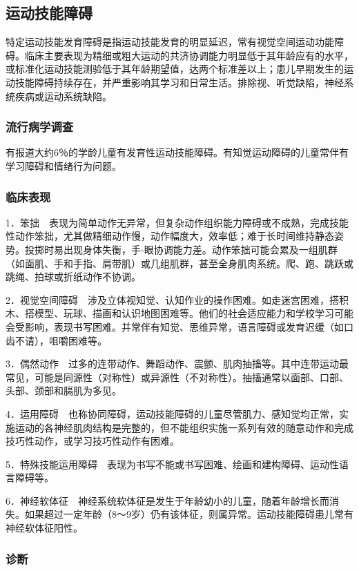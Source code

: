 \subsection{运动技能障碍}

特定运动技能发育障碍是指运动技能发育的明显延迟，常有视觉空间运动功能障碍。临床主要表现为精细或粗大运动的共济协调能力明显低于其年龄应有的水平，或标准化运动技能测验低于其年龄期望值，达两个标准差以上；患儿早期发生的运动技能障碍持续存在，并严重影响其学习和日常生活。排除视、听觉缺陷，神经系统疾病或运动系统缺陷。

\subsubsection{流行病学调查}

有报道大约6％的学龄儿童有发育性运动技能障碍。有知觉运动障碍的儿童常伴有学习障碍和情绪行为问题。

\subsubsection{临床表现}

1．笨拙　表现为简单动作无异常，但复杂动作组织能力障碍或不成熟，完成技能性动作笨拙，尤其做精细动作慢，动作幅度大，效率低；难于长时间维持静态姿势。投掷时易出现身体失衡，手-眼协调能力差。动作笨拙可能会累及一组肌群（如面肌、手和手指、肩带肌）或几组肌群，甚至全身肌肉系统。爬、跑、跳跃或跳绳、拍球或折纸动作不协调。

2．视觉空间障碍　涉及立体视知觉、认知作业的操作困难。如走迷宫困难，搭积木、搭模型、玩球、描画和认识地图困难等。他们的社会适应能力和学校学习可能会受影响，表现书写困难。并常伴有知觉、思维异常，语言障碍或发育迟缓（如口齿不请），咀嚼困难等。

3．偶然动作　过多的连带动作、舞蹈动作、震颤、肌肉抽搐等。其中连带运动最常见，可能是同源性（对称性）或异源性（不对称性）。抽搐通常以面部、口部、头部、颈部和膈肌为多见。

4．运用障碍　也称协同障碍，运动技能障碍的儿童尽管肌力、感知觉均正常，实施运动的各神经肌肉结构是完整的，但不能组织实施一系列有效的随意动作和完成技巧性动作，或学习技巧性动作有困难。

5．特殊技能运用障碍　表现为书写不能或书写困难、绘画和建构障碍、运动性语言障碍等。

6．神经软体征　神经系统软体征是发生于年龄幼小的儿童，随着年龄增长而消失。如果超过一定年龄（8～9岁）仍有该体征，则属异常。运动技能障碍患儿常有神经软体征阳性。

\subsubsection{诊断}

